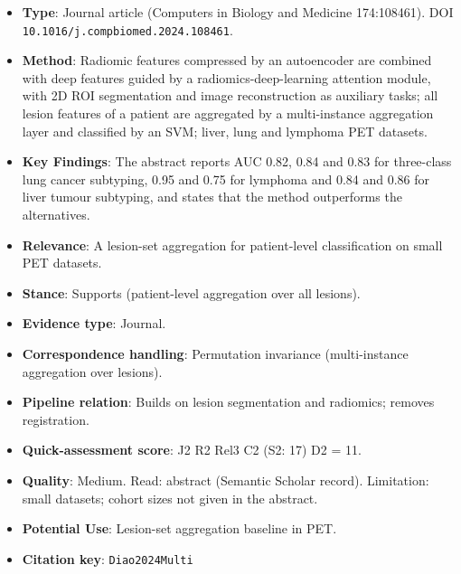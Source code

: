 \documentclass[journal,onecolumn]{IEEEtran}
\begin{document}
\begin{itemize}

\item{} \textbf{Type}: Journal article (Computers in Biology and Medicine 174:108461). DOI \nolinkurl{10.1016/j.compbiomed.2024.108461}.

\item{} \textbf{Method}: Radiomic features compressed by an autoencoder are combined with deep features guided by a radiomics-deep-learning attention module, with 2D ROI segmentation and image reconstruction as auxiliary tasks; all lesion features of a patient are aggregated by a multi-instance aggregation layer and classified by an SVM; liver, lung and lymphoma PET datasets.

\item{} \textbf{Key Findings}: The abstract reports AUC 0.82, 0.84 and 0.83 for three-class lung cancer subtyping, 0.95 and 0.75 for lymphoma and 0.84 and 0.86 for liver tumour subtyping, and states that the method outperforms the alternatives.

\item{} \textbf{Relevance}: A lesion-set aggregation for patient-level classification on small PET datasets.

\item{} \textbf{Stance}: Supports (patient-level aggregation over all lesions).

\item{} \textbf{Evidence type}: Journal.

\item{} \textbf{Correspondence handling}: Permutation invariance (multi-instance aggregation over lesions).

\item{} \textbf{Pipeline relation}: Builds on lesion segmentation and radiomics; removes registration.

\item{} \textbf{Quick-assessment score}: J2 R2 Rel3 C2 (S2: 17) D2 = 11.

\item{} \textbf{Quality}: Medium. Read: abstract (Semantic Scholar record). Limitation: small datasets; cohort sizes not given in the abstract.

\item{} \textbf{Potential Use}: Lesion-set aggregation baseline in PET.

\item{} \textbf{Citation key}: \texttt{Diao2024Multi}

\end{itemize}
\end{document}
